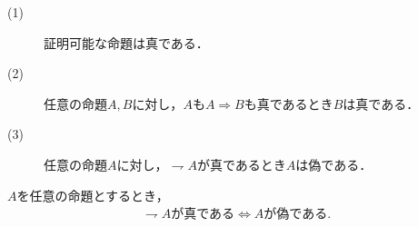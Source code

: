 	\begin{screen}
		\begin{axm}[論理の公理]\mbox{}
			\begin{description}
				\item[(1)] 証明可能な命題は真である．
				\item[(2)] 任意の命題$A,B$に対し，$A$も$A \Longrightarrow B$も真であるとき$B$は真である．
				\item[(3)] 任意の命題$A$に対し，$\rightharpoondown A$が真であるとき$A$は偽である．
			\end{description}
		\end{axm}
	\end{screen}
	
	\begin{screen}
		\begin{thm}
			$A$を任意の命題とするとき，
			\begin{align}
				\mbox{$\rightharpoondown A$が真である} \Longleftrightarrow \mbox{$A$が偽である}.
			\end{align}
		\end{thm}
	\end{screen}